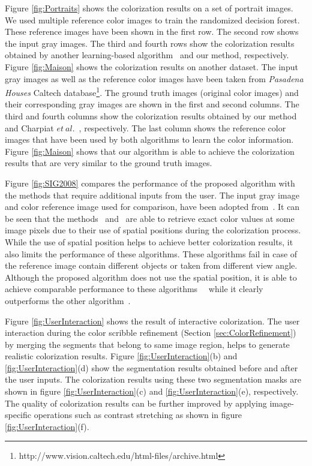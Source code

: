 \documentclass[twocolumn]{svjour3}          %
\begin{document}
Figure \ref{fig:Portraits} shows the colorization results on a set of portrait images. We used multiple reference color images to train the randomized decision forest. These reference images have been shown in the first row. The second row shows the input gray images. The third and fourth rows show the colorization results obtained by another learning-based algorithm~\cite{Charpiat08} and our method, respectively. Figure \ref{fig:Maison} shows the colorization results on another dataset. The input gray images as well as the reference color images have been taken from \emph{Pasadena Houses} Caltech database\footnote{http://www.vision.caltech.edu/html-files/archive.html}. The ground truth images (original color images) and their corresponding gray images are shown in the first and second columns. The third and fourth columns show the colorization results obtained by our method and Charpiat $et\ al.$~\cite{Charpiat08}, respectively. The last column shows the reference color images that have been used by both algorithms to learn the color information. Figure \ref{fig:Maison} shows that our algorithm is able to achieve the colorization results that are very similar to the ground truth images.

Figure \ref{fig:SIG2008} compares the performance of the proposed algorithm with the methods that require additional inputs from the user. The input gray image and color reference image used for comparison, have been adopted from~\cite{Liu08}. It can be seen that the methods~\cite{Liu08} and~\cite{Alex11} are able to retrieve exact color values at some image pixels due to their use of spatial positions during the colorization process. While the use of spatial position helps to achieve better colorization results, it also limits the performance of these algorithms. These algorithms fail in case of the reference image contain different objects or taken from different view angle. Although the proposed algorithm does not use the spatial position, it is able to achieve comparable performance to these algorithms~\cite{Liu08}~\cite{Alex11} while it clearly outperforms the other algorithm~\cite{Irony05}.

Figure \ref{fig:UserInteraction} shows the result of interactive colorization. The user interaction during the color scribble refinement (Section \ref{sec:ColorRefinement}) by merging the segments that belong to same image region, helps to generate realistic colorization results. Figure \ref{fig:UserInteraction}(b) and \ref{fig:UserInteraction}(d) show the segmentation results obtained before and after the user inputs. The colorization results using these two segmentation masks are shown in figure \ref{fig:UserInteraction}(c) and \ref{fig:UserInteraction}(e), respectively. The quality of colorization results can be further improved by applying image-specific operations such as contrast stretching as shown in figure \ref{fig:UserInteraction}(f).
\end{document}

